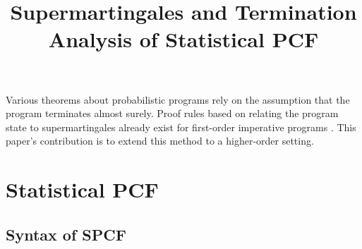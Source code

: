\documentclass{article}
\title{Supermartingales and Termination Analysis of Statistical PCF}
\theoremstyle{definition}
\theoremstyle{lemma}
\theoremstyle{remark}
\begin{document}
\maketitle


\begin{abstract}
\end{abstract}

\tableofcontents

Various theorems about probabilistic programs rely on the assumption that the program terminates almost surely. Proof rules based on relating the program state to supermartingales already exist for first-order imperative programs \citep{DBLP:journals/pacmpl/McIverMKK18}. This paper's contribution is to extend this method to a higher-order setting.

\section{Statistical PCF}

\subsection{Syntax of SPCF}
\end{document}
